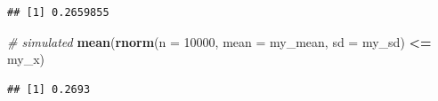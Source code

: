 \documentclass[]{book}
\newenvironment{Shaded}{\begin{snugshade}}{\end{snugshade}}
\newcommand{\CommentTok}[1]{\textcolor[rgb]{0.56,0.35,0.01}{\textit{#1}}}
\newcommand{\DataTypeTok}[1]{\textcolor[rgb]{0.13,0.29,0.53}{#1}}
\newcommand{\DecValTok}[1]{\textcolor[rgb]{0.00,0.00,0.81}{#1}}
\newcommand{\KeywordTok}[1]{\textcolor[rgb]{0.13,0.29,0.53}{\textbf{#1}}}
\newcommand{\NormalTok}[1]{#1}
\newcommand{\OperatorTok}[1]{\textcolor[rgb]{0.81,0.36,0.00}{\textbf{#1}}}
\newcommand{\StringTok}[1]{\textcolor[rgb]{0.31,0.60,0.02}{#1}}
\begin{document}
\begin{verbatim}
## [1] 0.2659855
\end{verbatim}

\begin{Shaded}
\begin{Highlighting}[]
\CommentTok{# simulated}
\KeywordTok{mean}\NormalTok{(}\KeywordTok{rnorm}\NormalTok{(}\DataTypeTok{n =} \DecValTok{10000}\NormalTok{, }\DataTypeTok{mean =}\NormalTok{ my_mean, }\DataTypeTok{sd =}\NormalTok{ my_sd) }\OperatorTok{<=}\StringTok{ }\NormalTok{my_x)}
\end{Highlighting}
\end{Shaded}

\begin{verbatim}
## [1] 0.2693
\end{verbatim}
\end{document}
